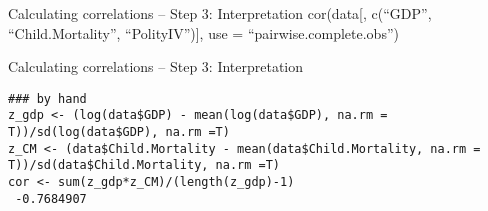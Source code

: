 \documentclass[presentation]{beamer}
\begin{document}
\begin{frame}[label={sec:org10e3a63}]{Calculating correlations -- Step 3: Interpretation}
cor(data[, c(``GDP'', ``Child.Mortality'', ``PolityIV'')], use = ``pairwise.complete.obs'')
\end{frame}

\begin{frame}[fragile,shrink=45,label={sec:org3594557}]{Calculating correlations -- Step 3: Interpretation}
 \begin{verbatim}
### by hand
z_gdp <- (log(data$GDP) - mean(log(data$GDP), na.rm = T))/sd(log(data$GDP), na.rm =T)
z_CM <- (data$Child.Mortality - mean(data$Child.Mortality, na.rm = T))/sd(data$Child.Mortality, na.rm =T)
cor <- sum(z_gdp*z_CM)/(length(z_gdp)-1)
 -0.7684907
\end{verbatim}
\end{frame}
\end{document}
